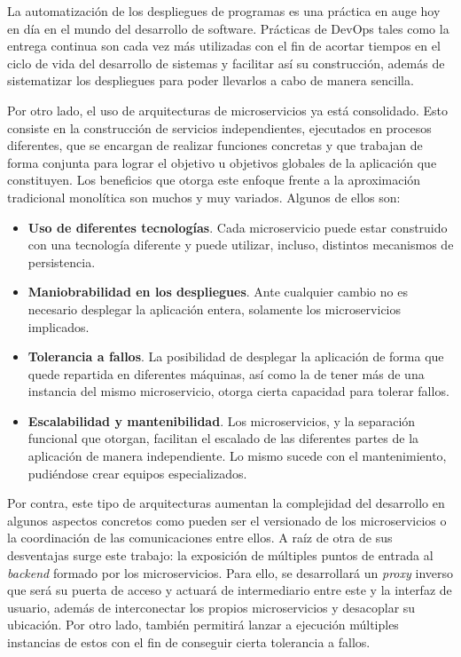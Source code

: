 \documentclass[11pt,spanish,listoffigures]{tfgetsinf}
\begin{document}
La automatización de los despliegues de programas es una práctica en auge hoy en día en el mundo del desarrollo de software. Prácticas de DevOps \cite{DevOps} tales como la entrega continua \cite{DevOpsPracticas} son cada vez más utilizadas con el fin de acortar tiempos en el ciclo de vida del desarrollo de sistemas y facilitar así su construcción, además de sistematizar los despliegues para poder llevarlos a cabo de manera sencilla.

Por otro lado, el uso de arquitecturas de microservicios \cite{Microservicios} ya está consolidado. Esto consiste en la construcción de servicios independientes, ejecutados en procesos diferentes, que se encargan de realizar funciones concretas y que trabajan de forma conjunta para lograr el objetivo u objetivos globales de la aplicación que constituyen. Los beneficios que otorga este enfoque frente a la aproximación tradicional monolítica son muchos y muy variados. Algunos de ellos son:

\begin{itemize}

	\item \textbf{Uso de diferentes tecnologías}. Cada microservicio puede estar construido con una tecnología diferente y puede utilizar, incluso, distintos mecanismos de persistencia.

	\item \textbf{Maniobrabilidad en los despliegues}. Ante cualquier cambio no es necesario desplegar la aplicación entera, solamente los microservicios implicados.

	\item \textbf{Tolerancia a fallos}. La posibilidad de desplegar la aplicación de forma que quede repartida en diferentes máquinas, así como la de tener más de una instancia del mismo microservicio, otorga cierta capacidad para tolerar fallos.

	\item \textbf{Escalabilidad y mantenibilidad}. Los microservicios, y la separación funcional que otorgan, facilitan el escalado de las diferentes partes de la aplicación de manera independiente. Lo mismo sucede con el mantenimiento, pudiéndose crear equipos especializados.

\end{itemize}

Por contra, este tipo de arquitecturas aumentan la complejidad del desarrollo en algunos aspectos concretos como pueden ser el versionado de los microservicios o la coordinación de las comunicaciones entre ellos. A raíz de otra de sus desventajas surge este trabajo: la exposición de múltiples puntos de entrada al \emph{backend} formado por los microservicios. Para ello, se desarrollará un \emph{proxy} inverso que será su puerta de acceso y actuará de intermediario entre este y la interfaz de usuario, además de interconectar los propios microservicios y desacoplar su ubicación. Por otro lado, también permitirá lanzar a ejecución múltiples instancias de estos con el fin de conseguir cierta tolerancia a fallos.
\end{document}
